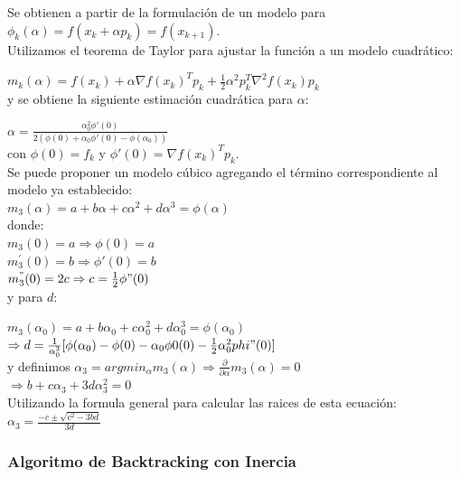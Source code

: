 \documentclass[10pt,journal,compsoc]{styles/IEEEtran}
\begin{document}
Se obtienen a partir de la formulaci\'on de un modelo para $\phi_k(\alpha)=f(x_k+\alpha p_k)=f(x_{k+1})$.\\

Utilizamos el teorema de Taylor para ajustar la funci\'on a un modelo cuadr\'atico:

$m_k(\alpha)=f(x_k)+\alpha \nabla f(x_k)^T p_k + \frac{1}{2} \alpha^2 p_k^{T}\nabla^{2} f(x_k)p_k$\\

y se obtiene la siguiente estimaci\'on cuadr\'atica para $\alpha$:

$\alpha=\frac{\alpha_0^2 \phi'(0)}{2(\phi(0)+\alpha_0 \phi'(0)-\phi(\alpha_0))}$\\

con $\phi(0)=f_k$ y $\phi'(0)=\nabla f(x_k)^T p_k$. \\

Se puede proponer un modelo c\'ubico agregando el t\'ermino correspondiente al modelo ya establecido:\\

$m_3(\alpha)=a+b\alpha+c\alpha^2+d\alpha^3=\phi(\alpha)$\\

donde:\\
$m_3(0)=a \Rightarrow \phi(0)=a$\\
$m_3^{'}(0)=b \Rightarrow \phi'(0)=b$\\
$m_3^{"}(0)=2c \Rightarrow c=\frac{1}{2} \phi"(0)$\\

y para $d$:

$m_3(\alpha_0)=a+b\alpha_0+c\alpha_0^2+d\alpha_0^3=\phi(\alpha_0)$\\

$\Rightarrow d=\frac{1}{\alpha_0^3}[\phi(\alpha_0)-\phi(0)-\alpha_0 \phi0(0)-\frac{1}{2}\alpha_0^2 phi"(0)]$\\

y definimos $\alpha_3=arg min_{\alpha} m_3(\alpha) \Rightarrow \frac{\partial}{\partial \alpha}m_3(\alpha)=0$\\

$\Rightarrow b+c\alpha_3+3d\alpha_3^2=0$\\

Utilizando la formula general para calcular las raices de esta ecuaci\'on:\\

$\alpha_3=\frac{-c\pm \sqrt{c^2-3bd}}{3d}$

\subsubsection{Algoritmo de Backtracking con Inercia}
\end{document}
